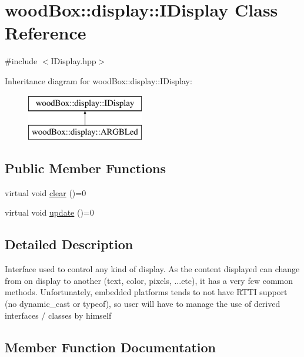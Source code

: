 \hypertarget{classwood_box_1_1display_1_1_i_display}{}\section{wood\+Box\+:\+:display\+:\+:I\+Display Class Reference}
\label{classwood_box_1_1display_1_1_i_display}


{\ttfamily \#include $<$I\+Display.\+hpp$>$}

Inheritance diagram for wood\+Box\+:\+:display\+:\+:I\+Display\+:\begin{figure}[H]
\begin{center}
\leavevmode
\includegraphics[height=2.000000cm]{classwood_box_1_1display_1_1_i_display}
\end{center}
\end{figure}
\subsection*{Public Member Functions}
\begin{DoxyCompactItemize}
\item 
virtual void \mbox{\hyperlink{classwood_box_1_1display_1_1_i_display_a7030f0768c1ef15ce936a259406168dc}{clear}} ()=0
\item 
virtual void \mbox{\hyperlink{classwood_box_1_1display_1_1_i_display_ad8c0811b8b807ce119a06c7806004de7}{update}} ()=0
\end{DoxyCompactItemize}


\subsection{Detailed Description}
Interface used to control any kind of display. As the content displayed can change from on display to another (text, color, pixels, ...etc), it has a very few common methods. Unfortunately, embedded platforms tends to not have R\+T\+TI support (no dynamic\+\_\+cast or typeof), so user will have to manage the use of derived interfaces / classes by himself 

\subsection{Member Function Documentation}
\mbox{\label{classwood_box_1_1display_1_1_i_display_a7030f0768c1ef15ce936a259406168dc}} 
